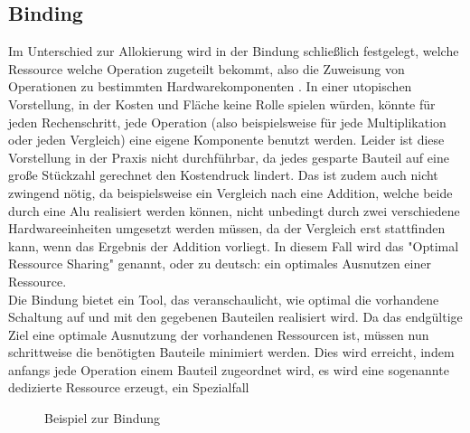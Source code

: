 \documentclass[conference]{IEEEtran}
\begin{document}
\subsection{Binding}
Im Unterschied zur Allokierung wird in der Bindung schließlich festgelegt, welche Ressource welche Operation zugeteilt bekommt, also die Zuweisung von Operationen zu bestimmten Hardwarekomponenten \cite{3}. In einer utopischen Vorstellung, in der Kosten und Fläche keine Rolle spielen würden, könnte für jeden Rechenschritt, jede Operation (also beispielsweise für jede Multiplikation oder jeden Vergleich) eine eigene Komponente benutzt werden. Leider ist diese Vorstellung in der Praxis nicht durchführbar, da jedes gesparte Bauteil auf eine große Stückzahl gerechnet den Kostendruck lindert. Das ist zudem auch nicht zwingend nötig, da beispielsweise ein Vergleich nach eine Addition, welche beide durch eine Alu realisiert werden können, nicht unbedingt durch zwei verschiedene Hardwareeinheiten umgesetzt werden müssen, da der Vergleich erst stattfinden kann, wenn das Ergebnis der Addition vorliegt. In diesem Fall wird das "Optimal Ressource Sharing" genannt, oder zu deutsch: ein optimales Ausnutzen einer Ressource\cite{2}.\\
Die Bindung bietet ein Tool, das veranschaulicht, wie optimal die vorhandene Schaltung auf und mit den gegebenen Bauteilen realisiert wird. Da das endgültige Ziel eine optimale Ausnutzung der vorhandenen Ressourcen ist, müssen nun schrittweise die benötigten Bauteile minimiert werden. Dies wird erreicht, indem anfangs jede Operation einem Bauteil zugeordnet wird, es wird eine sogenannte dedizierte Ressource erzeugt, ein Spezialfall \cite[S. 150]{3} 
\begin{figure}[h]
\caption{Beispiel zur Bindung}
\label{fig.1}
\end{figure} 
\end{document}
